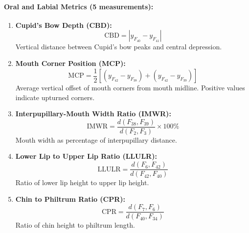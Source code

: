 \paragraph{Oral and Labial Metrics (5 measurements):}
\begin{enumerate}[resume]
    \item \textbf{Cupid's Bow Depth (CBD):}
    \begin{equation}
    \text{CBD} = |y_{F_{40}} - y_{F_{41}}|
    \end{equation}
    Vertical distance between Cupid's bow peaks and central depression.
    
    \item \textbf{Mouth Corner Position (MCP):}
    \begin{equation}
    \text{MCP} = \frac{1}{2}\left[(y_{F_{42}} - y_{F_{38}}) + (y_{F_{42}} - y_{F_{39}})\right]
    \end{equation}
    Average vertical offset of mouth corners from mouth midline. Positive values indicate upturned corners.
    
    \item \textbf{Interpupillary-Mouth Width Ratio (IMWR):}
    \begin{equation}
    \text{IMWR} = \frac{d(F_{38}, F_{39})}{d(F_2, F_3)} \times 100\%
    \end{equation}
    Mouth width as percentage of interpupillary distance.
    
    \item \textbf{Lower Lip to Upper Lip Ratio (LLULR):}
    \begin{equation}
    \text{LLULR} = \frac{d(F_6, F_{42})}{d(F_{42}, F_{40})}
    \end{equation}
    Ratio of lower lip height to upper lip height.
    
    \item \textbf{Chin to Philtrum Ratio (CPR):}
    \begin{equation}
    \text{CPR} = \frac{d(F_7, F_6)}{d(F_{40}, F_{34})}
    \end{equation}
    Ratio of chin height to philtrum length.
\end{enumerate}

